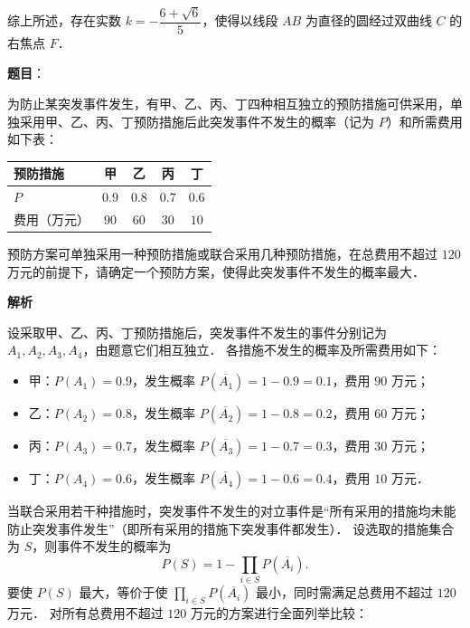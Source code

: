 \begin{answer}
综上所述，存在实数 $k = -\dfrac{6 + \sqrt{6}}{5}$，使得以线段 $AB$ 为直径的圆经过双曲线 $C$ 的右焦点 $F$．


\end{answer}
\begin{answer}

\textbf{题目}：

为防止某突发事件发生，有甲、乙、丙、丁四种相互独立的预防措施可供采用，单独采用甲、乙、丙、丁预防措施后此突发事件不发生的概率（记为 $P$）和所需费用如下表：

\begin{center}
\begin{tabular}{lcccc}
\toprule
预防措施 & 甲 & 乙 & 丙 & 丁 \\
\midrule
$P$ & $0.9$ & $0.8$ & $0.7$ & $0.6$ \\
费用（万元） & $90$ & $60$ & $30$ & $10$ \\
\bottomrule
\end{tabular}
\end{center}

预防方案可单独采用一种预防措施或联合采用几种预防措施，在总费用不超过 $120$ 万元的前提下，请确定一个预防方案，使得此突发事件不发生的概率最大．

\textbf{解析}

设采取甲、乙、丙、丁预防措施后，突发事件不发生的事件分别记为 $A_1, A_2, A_3, A_4$，由题意它们相互独立．
各措施不发生的概率及所需费用如下：
\begin{itemize}
\item 甲：$P(A_1) = 0.9$，发生概率 $P(\overline{A_1}) = 1 - 0.9 = 0.1$，费用 $90$ 万元；
\item 乙：$P(A_2) = 0.8$，发生概率 $P(\overline{A_2}) = 1 - 0.8 = 0.2$，费用 $60$ 万元；
\item 丙：$P(A_3) = 0.7$，发生概率 $P(\overline{A_3}) = 1 - 0.7 = 0.3$，费用 $30$ 万元；
\item 丁：$P(A_4) = 0.6$，发生概率 $P(\overline{A_4}) = 1 - 0.6 = 0.4$，费用 $10$ 万元．
\end{itemize}

当联合采用若干种措施时，突发事件不发生的对立事件是“所有采用的措施均未能防止突发事件发生”（即所有采用的措施下突发事件都发生）．
设选取的措施集合为 $S$，则事件不发生的概率为
\nopagebreak[4]
\[
P(S) = 1 - \prod_{i \in S} P(\overline{A_i}).
\]
要使 $P(S)$ 最大，等价于使 $\prod_{i \in S} P(\overline{A_i})$ 最小，同时需满足总费用不超过 $120$ 万元．
对所有总费用不超过 $120$ 万元的方案进行全面列举比较：


\end{answer}
